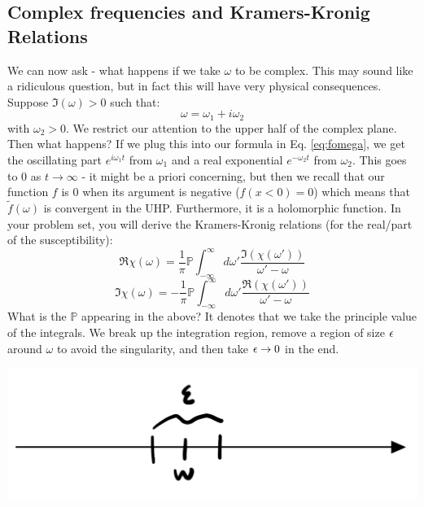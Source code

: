 \subsection{Complex frequencies and Kramers-Kronig Relations}
We can now ask - what happens if we take $\omega$ to be complex. This may sound like a ridiculous question, but in fact this will have very physical consequences. Suppose $\Im(\omega) > 0$ such that:
\begin{equation}
    \omega = \omega_1 + i\omega_2
\end{equation}
with $\omega_2 > 0$. We restrict our attention to the upper half of the complex plane. Then what happens? If we plug this into our formula in Eq. \eqref{eq:fomega}, we get the oscillating part $e^{i\omega_1 t}$ from $\omega_1$ and a real exponential $e^{-\omega_2 t}$ from $\omega_2$. This goes to 0 as $t \to \infty$ - it might be a priori concerning, but then we recall that our function $f$ is 0 when its argument is negative ($f(x < 0) = 0$) which means that $\tilde{f}(\omega)$ is convergent in the UHP. Furthermore, it is a holomorphic function. In your problem set, you will derive the Kramers-Kronig relations (for the real/part of the susceptibility):
\begin{equation}
    \Re\chi(\omega) = \frac{1}{\pi}\mathbb{P}\int_{-\infty}^\infty d\omega' \frac{\Im(\chi(\omega'))}{\omega' - \omega}
\end{equation}
\begin{equation}
    \Im\chi(\omega) = -\frac{1}{\pi}\mathbb{P}\int_{-\infty}^\infty d\omega' \frac{\Re(\chi(\omega'))}{\omega' - \omega}
\end{equation}
What is the $\mathbb{P}$ appearing in the above? It denotes that we take the principle value of the integrals. We break up the integration region, remove a region of size $\epsilon$ around $\omega$ to avoid the singularity, and then take $\epsilon \to 0$ in the end.

\begin{center}
    \includegraphics[scale=0.35]{Lectures/Images/lec13-principal.png}
\end{center}

